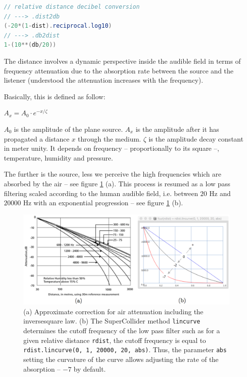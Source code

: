 \documentclass{book}
\begin{document}
\bigskip

\begin{lstlisting}[basicstyle=\footnotesize\ttfamily,language=java]
// relative distance decibel conversion
// ---> .dist2db
(-20*(1-dist).reciprocal.log10)
// ---> .db2dist
1-(10**(db/20))
\end{lstlisting}

\bigskip

The distance involves a dynamic perspective inside the audible field in terms of frequency attenuation due to the absorption rate between the source and the listener (understood the attenuation increases with the frequency). 

Basically, this is defined as follow:

\bigskip

$A_x=A_0\cdot e^{- x/\zeta}$ 

\bigskip

$A_0$ is the amplitude of the plane source. $A_x$ is the amplitude after it has propagated a distance $x$ through the medium.
$\zeta$ is the amplitude decay constant in meter unity. It depends on frequency -- proportionally to its square --, temperature, humidity and pressure.

\bigskip

The further is the source, less we perceive the high frequencies which are absorbed by the air -- see figure \ref{fig:fcut} (a). This process is resumed as a low pass filtering scaled according to the human audible field, i.e. between $20$ Hz and $20000$ Hz with an exponential progression -- see figure \ref{fig:fcut} (b).

\begin{figure}[H]
\begin{center}
\includegraphics[width=\textwidth]{img/6785}
\caption[]{(a) \citep{bk} Approximate correction for air attenuation including the inversesquare law. (b) The SuperCollider method \texttt{lincurve} determines the cutoff frequency of the low pass filter such as for a given relative distance \texttt{rdist}, the cutoff frequency is equal to \texttt{rdist.lincurve(0, 1, 20000, 20, abs)}. Thus, the parameter \texttt{abs} setting the curvature of the curve allows adjusting the rate of the absorption -- $-7$ by default. 
}
\label{fig:fcut}
\end{center}
\end{figure}
\end{document}
